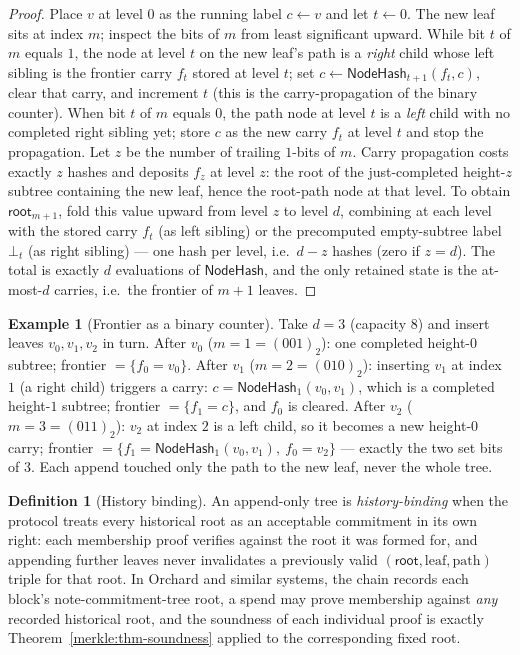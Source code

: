 \documentclass[11pt,a4paper]{article}
\theoremstyle{definition}
\newtheorem{definition}[theorem]{Definition}
\newtheorem{example}[theorem]{Example}
\theoremstyle{remark}
\begin{document}
\begin{proof}
Place \(v\) at level \(0\) as the running label \(c \leftarrow v\) and let \(t \leftarrow 0\). The new leaf sits at index \(m\); inspect the bits of \(m\) from least significant upward. While bit \(t\) of \(m\) equals \(1\), the node at level \(t\) on the new leaf's path is a \emph{right} child whose left sibling is the frontier carry \(f_t\) stored at level \(t\); set \(c \leftarrow \mathsf{NodeHash}_{t+1}(f_t, c)\), clear that carry, and increment \(t\) (this is the carry-propagation of the binary counter). When bit \(t\) of \(m\) equals \(0\), the path node at level \(t\) is a \emph{left} child with no completed right sibling yet; store \(c\) as the new carry \(f_t\) at level \(t\) and stop the propagation. Let \(z\) be the number of trailing \(1\)-bits of \(m\). Carry propagation costs exactly \(z\) hashes and deposits \(f_z\) at level \(z\): the root of the just-completed height-\(z\) subtree containing the new leaf, hence the root-path node at that level. To obtain \(\mathsf{root}_{m+1}\), fold this value upward from level \(z\) to level \(d\), combining at each level with the stored carry \(f_t\) (as left sibling) or the precomputed empty-subtree label \(\bot_t\) (as right sibling) --- one hash per level, i.e.\ \(d - z\) hashes (zero if \(z = d\)). The total is exactly \(d\) evaluations of \(\mathsf{NodeHash}\), and the only retained state is the at-most-\(d\) carries, i.e.\ the frontier of \(m+1\) leaves.
\end{proof}

\begin{example}[Frontier as a binary counter]\label{merkle:exp-frontier}
Take \(d = 3\) (capacity \(8\)) and insert leaves \(v_0, v_1, v_2\) in turn.
After \(v_0\) (\(m=1=(001)_2\)): one completed height-\(0\) subtree; frontier \(= \{f_0 = v_0\}\).
After \(v_1\) (\(m=2=(010)_2\)): inserting \(v_1\) at index \(1\) (a right child) triggers a carry: \(c = \mathsf{NodeHash}_1(v_0, v_1)\), which is a completed height-\(1\) subtree; frontier \(= \{f_1 = c\}\), and \(f_0\) is cleared.
After \(v_2\) (\(m=3=(011)_2\)): \(v_2\) at index \(2\) is a left child, so it becomes a new height-\(0\) carry; frontier \(= \{f_1 = \mathsf{NodeHash}_1(v_0, v_1),\ f_0 = v_2\}\) --- exactly the two set bits of \(3\). Each append touched only the path to the new leaf, never the whole tree.
\end{example}

\begin{definition}[History binding]\label{merkle:def-append-sound}
An append-only tree is \emph{history-binding} when the protocol treats every historical root as an acceptable commitment in its own right: each membership proof verifies against the root it was formed for, and appending further leaves never invalidates a previously valid \((\mathsf{root}, \text{leaf}, \text{path})\) triple for that root. In Orchard and similar systems, the chain records each block's note-commitment-tree root, a spend may prove membership against \emph{any} recorded historical root, and the soundness of each individual proof is exactly Theorem~\ref{merkle:thm-soundness} applied to the corresponding fixed root.
\end{definition}
\end{document}
